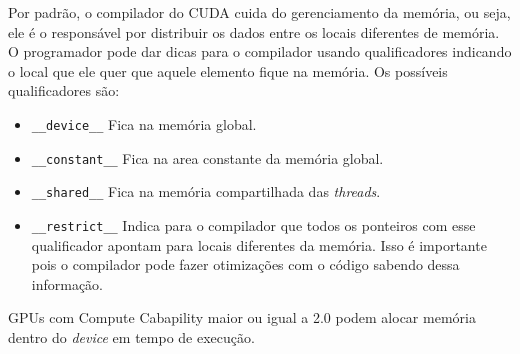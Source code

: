 Por padrão, o compilador do CUDA cuida do gerenciamento da memória, ou seja, ele é o responsável por distribuir os dados
entre os locais diferentes de memória. O programador pode dar dicas para o compilador usando qualificadores indicando o local
que ele quer que aquele elemento fique na memória. Os possíveis qualificadores são:
\begin{itemize}
  \item \verb#__device__# Fica na memória global.
  \item \verb#__constant__#   Fica na area constante da memória global.
  \item \verb#__shared__# Fica na memória compartilhada das \textit{threads}.
  \item \verb#__restrict__# Indica para o compilador que todos os ponteiros com esse qualificador apontam para locais diferentes
                            da memória. Isso é importante pois o compilador pode fazer otimizações com o código sabendo dessa informação.
\end{itemize}

GPUs com Compute Cabapility maior ou igual a 2.0 podem alocar memória dentro do \textit{device} em tempo de execução.
